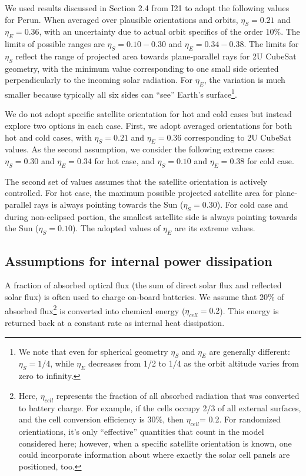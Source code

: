 \documentclass[]{aastex62}
\begin{document}
We used results discussed in Section 2.4 from I21 to adopt the following values for Perun.
When averaged over plausible orientations and orbits, $\eta_S = 0.21$ and $\eta_E = 0.36$, 
with an uncertainty due to actual orbit specifics of the order 10\%. The limits of 
possible ranges are  $\eta_S = 0.10 - 0.30$ and $\eta_E = 0.34 - 0.38$. The limits for 
$\eta_S$ reflect the range of projected area towards plane-parallel rays for 2U CubeSat geometry, 
with the minimum value corresponding to one small side oriented perpendicularly to the incoming 
solar radiation. For $\eta_E$, the variation is much smaller because typically all six sides can 
``see'' Earth's surface\footnote{We note that even for spherical geometry $\eta_S$ and $\eta_E$
are generally different:  $\eta_S=1/4$, while $\eta_E$ decreases from 1/2 to 1/4 as the orbit
altitude varies from zero to infinity.}. 
 
We do not adopt specific satellite orientation for hot and cold cases but instead explore two 
options in each case.  First, we adopt averaged orientations for both hot and cold cases,
with $\eta_S = 0.21$ and $\eta_E = 0.36$ corresponding to 2U CubeSat values. As the second 
assumption, we consider the following extreme cases: $\eta_S = 0.30$ and $\eta_E = 0.34$ for 
hot case, and $\eta_S = 0.10$ and $\eta_E = 0.38$ for cold case.  
 
The second set of values assumes that the satellite orientation is actively controlled.  For hot
case, the maximum possible projected satellite area for plane-parallel rays is always pointing 
towards the Sun ($\eta_S = 0.30$). For cold case and during non-eclipsed portion, the smallest 
satellite side is always pointing towards the Sun ($\eta_S = 0.10$).  The adopted values of 
$\eta_E$ are its extreme values. 

 
\subsection{Assumptions for internal power dissipation}


A fraction of absorbed optical flux (the sum of direct solar flux and reflected solar flux) is often 
used to charge on-board batteries. We assume that 20\% of absorbed flux\footnote{Here, $\eta_{cell}$ 
represents the fraction of all absorbed radiation that was converted to battery charge. For example, if 
the cells occupy 2/3 of all external surfaces, and the cell conversion efficiency is 30\%, then $\eta_{cell}$= 0.2. 
For randomized orientiations, it's only ``effective'' quantities that count in the model considered here; 
however, when a specific satellite orientation is known, one could incorporate information about where 
exactly the solar cell panels are positioned, too.} is converted into chemical
energy ($\eta_{cell}=0.2$). This energy is returned back at a constant rate as internal heat dissipation. 
\end{document}
